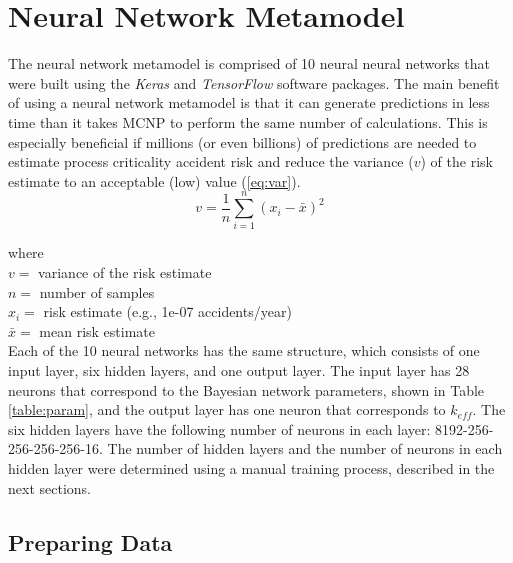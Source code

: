 
\chapter{Neural Network Metamodel}

The neural network metamodel is comprised of 10 neural neural networks that were built using the \textit{Keras} \cite{keras} and \textit{TensorFlow} \cite{tensorflow} software packages.
The main benefit of using a neural network metamodel is that it can generate predictions in less time than it takes MCNP to perform the same number of calculations. %
This is especially beneficial if millions (or even billions) of predictions are needed to estimate process criticality accident risk and reduce the variance ($v$) of the risk estimate to an acceptable (low) value (\ref{eq:var}).
%
\begin{equation}
  \label{eq:var}
  v = \frac{1}{n} \sum_{i = 1}^{n}(x_{i} - \bar{x})^{2}
\end{equation}

\noindent where \\
\indent $v = $ variance of the risk estimate \\
\indent $n = $ number of samples \\
\indent $x_{i} = $ risk estimate (e.g., 1e-07 accidents/year) \\
\indent $\bar{x} = $ mean risk estimate \\

\noindent Each of the 10 neural networks has the same structure, which consists of one input layer, six hidden layers, and one output layer.
The input layer has 28 neurons that correspond to the Bayesian network parameters, shown in Table \ref{table:param}, and the output layer has one neuron that corresponds to $k_{eff}$.
The six hidden layers have the following number of neurons in each layer: 8192-256-256-256-256-16.
The number of hidden layers and the number of neurons in each hidden layer were determined using a manual training process, described in the next sections.

\section{Preparing Data}

